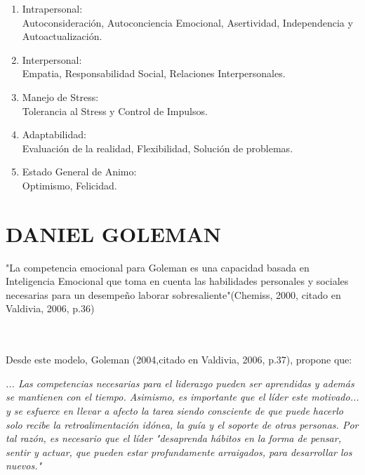 \begin{enumerate}[label=\itembolasazules{}]
\item Intrapersonal: \\
Autoconsideración, Autoconciencia Emocional, Asertividad, Independencia y Autoactualización.
\item Interpersonal: \\
Empatia, Responsabilidad Social, Relaciones Interpersonales.
\item Manejo de Stress: \\
Tolerancia al Stress y Control de Impulsos.
\item Adaptabilidad: \\
Evaluación de la realidad, Flexibilidad, Solución de problemas.
\item Estado General de Animo: \\
Optimismo, Felicidad.
\end{enumerate}













\section{DANIEL GOLEMAN}



\begin{caja}[]
"La competencia emocional para Goleman es una capacidad basada en Inteligencia Emocional que toma en cuenta las habilidades personales y sociales necesarias para un desempeño laborar sobresaliente"(Chemiss, 2000, citado en Valdivia, 2006, p.36)%
\end{caja}\\\\


Desde este modelo, Goleman (2004,citado en Valdivia, 2006, p.37), propone que:
\begin{definicion}[]
{\it ... Las competencias necesarias para el liderazgo pueden ser aprendidas y además se mantienen con el tiempo. Asimismo, es importante que el líder este motivado... y se esfuerce en llevar a afecto la tarea siendo consciente de que puede hacerlo solo recibe la retroalimentación idónea, la guía y el soporte de otras personas. Por tal razón, es necesario que el líder "desaprenda hábitos en la forma de pensar, sentir y actuar, que pueden estar profundamente arraigados, para desarrollar los nuevos."}
\end{definicion}
\\%


